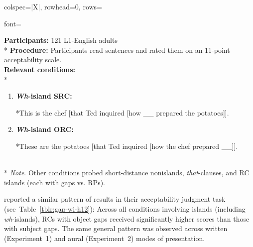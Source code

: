 \begin{longtblr}[caption={\textcite{keffala.goodall2011}: Acceptability judgment task}, label={tblr:gap-wi-kg11}]{colspec={|X|}, rowhead=0, rows={font=\raggedright{}}}\hline
\textbf{Participants:} 121 L1-English adults \vspace{5pt}\\*
\textbf{Procedure:} Participants read sentences and rated them on an 11-point acceptability scale. \vspace{5pt}\\
\textbf{Relevant conditions:} \vspace{5pt}\\*
\begin{varwidth}{\linewidth}\begin{enumerate}[\bfseries (a),itemsep=5pt] 
\item \textbf{\textit{Wh}-island SRC:}\par\nobreak\vspace{3pt}
*This is the chef [that Ted inquired [how \_\_ prepared the potatoes]].
\item \textbf{\textit{Wh}-island ORC:}\par\nobreak\vspace{3pt}
*These are the potatoes [that Ted inquired [how the chef prepared \_\_]].
\end{enumerate}\end{varwidth}\vspace{5pt}\\*
\textit{Note}. Other conditions probed short-distance nonislands, \textit{that}-clauses, and RC islands (each with gaps vs. RPs). \\\hline
\end{longtblr}

\noindent \textcite{han.etal2012} reported a similar pattern of results in their acceptability judgment task (see~Table~\ref{tblr:gap-wi-h12}): Across all conditions involving islands (including \textit{wh}-islands), RCs with object gaps received significantly higher scores than those with subject gaps. The same general pattern was observed across written (Experiment~1) and aural (Experiment~2) modes of presentation.

